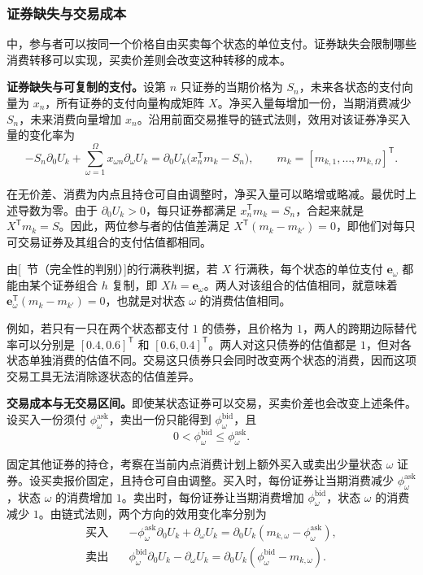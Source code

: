 \subsubsection{证券缺失与交易成本}
\label{sec:wj-three-trade-frictions}
 中，参与者可以按同一个价格自由买卖每个状态的单位支付。证券缺失会限制哪些消费转移可以实现，买卖价差则会改变这种转移的成本。

\textbf{证券缺失与可复制的支付。}设第 $n$ 只证券的当期价格为 $S_n$，未来各状态的支付向量为 $x_n$，所有证券的支付向量构成矩阵 $X$。净买入量每增加一份，当期消费减少 $S_n$，未来消费向量增加 $x_n$。沿用前面交易推导的链式法则，效用对该证券净买入量的变化率为
\[
 -S_n\partial_0U_k+\sum_{\omega=1}^{\Omega}x_{\omega n}\partial_\omega U_k
 =\partial_0U_k\bigl(x_n^{\mathsf T}m_k-S_n\bigr),
 \qquad m_k=[m_{k,1},\ldots,m_{k,\Omega}]^{\mathsf T}.
\]

在无价差、消费为内点且持仓可自由调整时，净买入量可以略增或略减。最优时上述导数为零。由于 $\partial_0U_k>0$，每只证券都满足 $x_n^{\mathsf T}m_k=S_n$，合起来就是 $X^{\mathsf T}m_k=S$。因此，两位参与者的估值差满足 $X^{\mathsf T}(m_k-m_{k'})=0$，即他们对每只可交易证券及其组合的支付估值都相同。

由[~节（完全性的判别）]的行满秩判据，若 $X$ 行满秩，每个状态的单位支付 $\mathbf e_\omega$ 都能由某个证券组合 $h$ 复制，即 $Xh=\mathbf e_\omega$。两人对该组合的估值相同，就意味着 $\mathbf e_\omega^{\mathsf T}(m_k-m_{k'})=0$，也就是对状态 $\omega$ 的消费估值相同。

例如，若只有一只在两个状态都支付 $1$ 的债券，且价格为 $1$，两人的跨期边际替代率可以分别是 $[0.4,0.6]^{\mathsf T}$ 和 $[0.6,0.4]^{\mathsf T}$。两人对这只债券的估值都是 $1$，但对各状态单独消费的估值不同。交易这只债券只会同时改变两个状态的消费，因而这项交易工具无法消除逐状态的估值差异。

\textbf{交易成本与无交易区间。}即使某状态证券可以交易，买卖价差也会改变上述条件。设买入一份须付 $\phi_\omega^{\mathrm{ask}}$，卖出一份只能得到 $\phi_\omega^{\mathrm{bid}}$，且
\[
 0<\phi_\omega^{\mathrm{bid}}\le\phi_\omega^{\mathrm{ask}}.
\]

固定其他证券的持仓，考察在当前内点消费计划上额外买入或卖出少量状态 $\omega$ 证券。设买卖报价固定，且持仓可自由调整。买入时，每份证券让当期消费减少 $\phi_\omega^{\mathrm{ask}}$，状态 $\omega$ 的消费增加 $1$。卖出时，每份证券让当期消费增加 $\phi_\omega^{\mathrm{bid}}$，状态 $\omega$ 的消费减少 $1$。由链式法则，两个方向的效用变化率分别为
\[
 \begin{aligned}
 \text{买入}\quad&
 -\phi_\omega^{\mathrm{ask}}\partial_0U_k+\partial_\omega U_k
 =\partial_0U_k(m_{k,\omega}-\phi_\omega^{\mathrm{ask}}),\\
 \text{卖出}\quad&
 \phi_\omega^{\mathrm{bid}}\partial_0U_k-\partial_\omega U_k
 =\partial_0U_k(\phi_\omega^{\mathrm{bid}}-m_{k,\omega}).
 \end{aligned}
\]

